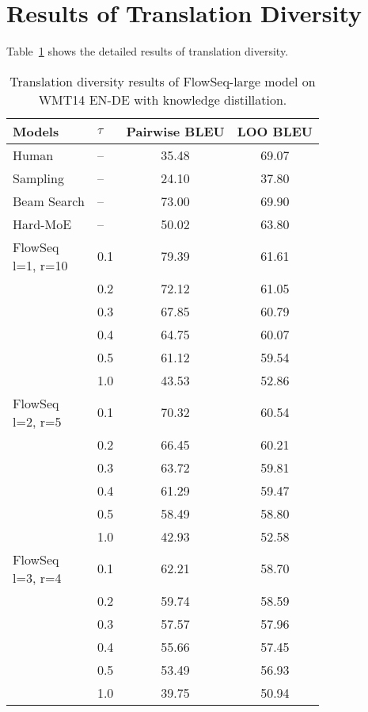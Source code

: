 \documentclass[11pt,a4paper]{article}
\begin{document}
\section{Results of Translation Diversity}\label{appendix:deversity}
Table~\ref{tab:diverse} shows the detailed results of translation diversity.

\begin{table}[h]
\centering
\resizebox{0.5\columnwidth}{!}
{
\begin{tabular}{llcc}
\toprule
\textbf{Models} & $\tau$ & \textbf{Pairwise BLEU} & \textbf{LOO BLEU} \\
\midrule
Human & -- & 35.48 & 69.07 \\
Sampling & -- & 24.10 & 37.80 \\
Beam Search & -- & 73.00 & 69.90\\
Hard-MoE & -- & 50.02 & 63.80 \\
\midrule
\multirowcell{6}{FlowSeq \\ l=1, r=10} 
& 0.1 & 79.39 & 61.61 \\
& 0.2 & 72.12 & 61.05 \\
& 0.3 & 67.85 & 60.79 \\
& 0.4 & 64.75 & 60.07 \\
& 0.5 & 61.12 & 59.54  \\
& 1.0 & 43.53 & 52.86 \\
\midrule
\multirowcell{6}{FlowSeq \\ l=2, r=5}
& 0.1 & 70.32 & 60.54 \\
& 0.2 & 66.45 & 60.21 \\
& 0.3 & 63.72 & 59.81 \\
& 0.4 & 61.29 & 59.47 \\
& 0.5 & 58.49 & 58.80 \\
& 1.0 & 42.93 & 52.58 \\
\midrule
\multirowcell{6}{FlowSeq \\ l=3, r=4} 
& 0.1 & 62.21 & 58.70 \\
& 0.2 & 59.74 & 58.59\\
& 0.3 & 57.57 & 57.96 \\
& 0.4 & 55.66 & 57.45 \\
& 0.5 & 53.49 & 56.93 \\
& 1.0 & 39.75 & 50.94 \\
\bottomrule
\end{tabular}
}
\caption{Translation diversity results of FlowSeq-large model on WMT14 EN-DE with knowledge distillation.}
\label{tab:diverse}
\vspace{-4mm}
\end{table}
\end{document}
